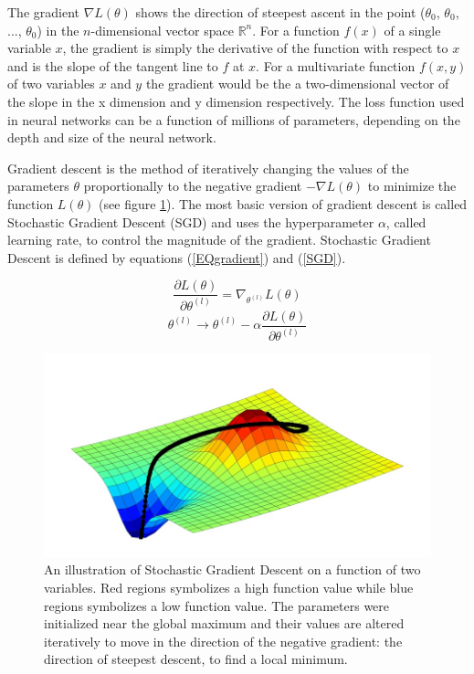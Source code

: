 \documentclass[a4paper, twoside]{article}
\newcommand*{\pd}[2]{\ensuremath{\dfrac{\partial #1}{\partial #2}}}
\begin{document}
The gradient $\nabla L(\theta)$ shows the direction of steepest ascent in the point ($\theta_{0}$, $\theta_{0}$, ..., $\theta_{0}$) in the $n$-dimensional vector space $\mathbb{R}^{n}$. For a function $f(x)$ of a single variable $x$, the gradient is simply the derivative of the function with respect to $x$ and is the slope of the tangent line to $f$ at $x$. For a multivariate function $f(x,y)$ of two variables $x$ and $y$ the gradient would be the a two-dimensional vector of the slope in the x dimension and y dimension respectively. The loss function used in neural networks can be a function of millions of parameters, depending on the depth and size of the neural network. \cite{gradient} \cite{convmath} 

Gradient descent is the method of iteratively changing the values of the parameters $\theta$ proportionally to the negative gradient $-\nabla L(\theta)$ to minimize the function $L(\theta)$ (see figure \ref{figSGD}). The most basic version of gradient descent is called Stochastic Gradient Descent (SGD) and uses the hyperparameter $\alpha$, called learning rate, to control the magnitude of the gradient. Stochastic Gradient Descent is defined by equations (\ref{EQgradient}) and (\ref{SGD}). \cite{gradient} \cite{convmath} \cite{wikiStanford}

\begin{equation}\label{EQgradient}
\pd{L(\theta)}{\theta^{(l)}} = \nabla_{\theta^{(l)}} L(\theta)
\end{equation}
\begin{equation}\label{SGD}
\theta^{(l)} \to \theta^{(l)} - \alpha \pd{L(\theta)}{\theta^{(l)}}
\end{equation}
\begin{figure}[h]
	\centering
  		\includegraphics[scale=0.5]{SGD.png}
  	\caption{An illustration of Stochastic Gradient Descent on a function of two variables. Red regions symbolizes a high function value while blue regions symbolizes a low function value. The parameters were initialized near the global maximum and their values are altered iteratively to move in the direction of the negative gradient: the direction of steepest descent, to find a local minimum. \cite{figSGD}} \label{figSGD}
\end{figure}
\end{document}

